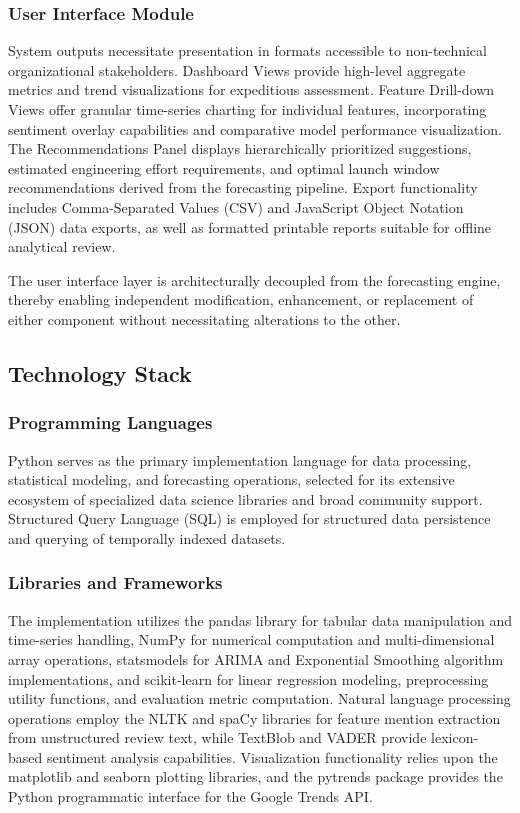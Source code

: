 \subsubsection{User Interface Module}
System outputs necessitate presentation in formats accessible to non-technical organizational stakeholders. Dashboard Views provide high-level aggregate metrics and trend visualizations for expeditious assessment. Feature Drill-down Views offer granular time-series charting for individual features, incorporating sentiment overlay capabilities and comparative model performance visualization. The Recommendations Panel displays hierarchically prioritized suggestions, estimated engineering effort requirements, and optimal launch window recommendations derived from the forecasting pipeline. Export functionality includes Comma-Separated Values (CSV) and JavaScript Object Notation (JSON) data exports, as well as formatted printable reports suitable for offline analytical review.

The user interface layer is architecturally decoupled from the forecasting engine, thereby enabling independent modification, enhancement, or replacement of either component without necessitating alterations to the other.

\subsection{Technology Stack}

\subsubsection{Programming Languages}
Python serves as the primary implementation language for data processing, statistical modeling, and forecasting operations, selected for its extensive ecosystem of specialized data science libraries and broad community support. Structured Query Language (SQL) is employed for structured data persistence and querying of temporally indexed datasets.

\subsubsection{Libraries and Frameworks}
The implementation utilizes the pandas library for tabular data manipulation and time-series handling, NumPy for numerical computation and multi-dimensional array operations, statsmodels for ARIMA and Exponential Smoothing algorithm implementations, and scikit-learn for linear regression modeling, preprocessing utility functions, and evaluation metric computation. Natural language processing operations employ the NLTK and spaCy libraries for feature mention extraction from unstructured review text, while TextBlob and VADER provide lexicon-based sentiment analysis capabilities. Visualization functionality relies upon the matplotlib and seaborn plotting libraries, and the pytrends package provides the Python programmatic interface for the Google Trends API.

